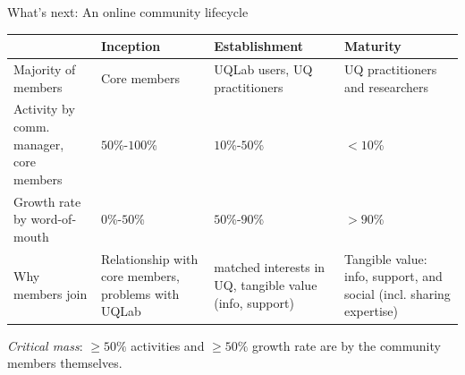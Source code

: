 \documentclass[]{rsuqbeamernew}
\begin{document}
\begin{frame}[t]{What's next: An online community lifecycle}

\begin{tabularx}{\textwidth}{XXXX}
  \hline
                                    & Inception    & Establishment  & Maturity \\
  \hline
  \footnotesize{Majority of members}
  & Core members
  & UQLab users, UQ practitioners
  & UQ practitioners and researchers  \\
  
  \footnotesize{Activity by comm. manager, core members}
  & $50$\%-$100$\%
  & $10$\%-$50$\% 
  & $<10$\% \\
  
  \footnotesize{Growth rate by word-of-mouth}
  & $0$\%-$50$\% 
  & $50$\%-$90$\%
  & $>90$\% \\
  
  \footnotesize{Why members join}
  & Relationship with core members, problems with UQLab
  & matched interests in UQ, tangible value (info, support)
  & Tangible value: info, support, and social (incl. sharing expertise) \\
  \hline
\end{tabularx}

\vspace{0.35cm}

\emph{Critical mass}: $\geq 50\%$ activities and $\geq 50\%$ growth rate
are by the community members themselves.

\end{frame}
\end{document}
